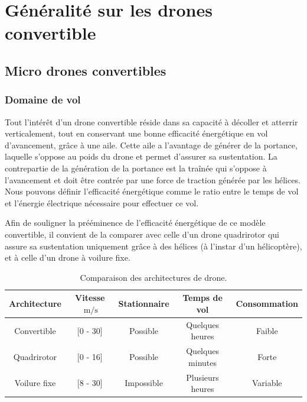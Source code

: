 \chapter{Généralité sur les drones convertible}
\minitoc
\label{chap:generalites}


\section{Micro drones convertibles}

    \subsection{Domaine de vol} 
    Tout l'intérêt d'un drone convertible réside dans sa capacité à décoller et atterrir verticalement, tout en conservant une bonne efficacité énergétique en vol d'avancement, grâce à une aile. Cette aile a l'avantage de générer de la portance, laquelle s'oppose au poids du drone et permet d'assurer sa sustentation. La contrepartie de la génération de la portance est la traînée qui s'oppose à l'avancement et doit être contrée par une force de traction générée par les hélices. Nous pouvons définir l'efficacité énergétique comme le ratio entre le temps de vol et l'énergie électrique nécessaire pour effectuer ce vol.
    
    Afin de souligner la prééminence de l'efficacité énergétique de ce modèle convertible, il convient de la comparer avec celle d'un drone quadrirotor qui assure sa sustentation uniquement grâce à des hélices (à l'instar d'un hélicoptère), et à celle d'un drone à voilure fixe.
    \begin{table}[ht]
        \centering
        \begin{tabular}{|c|c|c|c|c|}
            \hline
            Architecture & Vitesse $\SI{}{\meter\per\second}$  & Stationnaire & Temps de vol & Consommation\\
            \hline \hline
            Convertible & [0 - 30] & Possible & Quelques heures & Faible\\
            \hline
            Quadrirotor & [0 - 16] & Possible& Quelques minutes & Forte\\
            \hline
            Voilure fixe & [8 - 30] & Impossible & Plusieurs heures & Variable \\
            \hline
        \end{tabular}
        \caption{Comparaison des architectures de drone.}
    \end{table}

